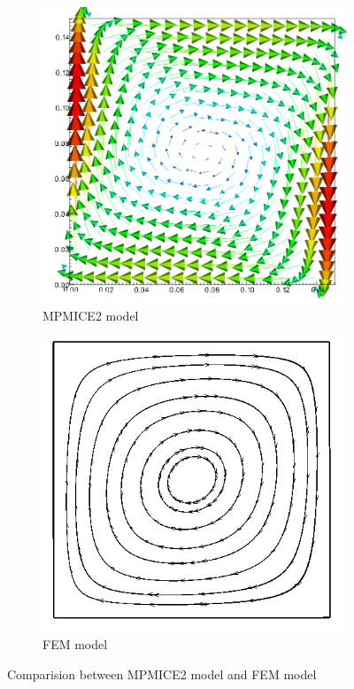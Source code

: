 \documentclass[preprint,12pt]{elsarticle}
\begin{document}
\begin{figure}[h]
\center
\begin{subfigure}[c]{0.5\linewidth}
\includegraphics[width=\linewidth]{thermal.png}
\caption{MPMICE2 model}
\end{subfigure}\hfill    
\begin{subfigure}[d]{0.5\linewidth}
\includegraphics[width=\linewidth]{velocity_thermal-1.jpg}
\caption{FEM model}
\end{subfigure}
\caption{Comparision between MPMICE2 model and FEM model}
\label{fig:thermal}
\end{figure}
\end{document}

